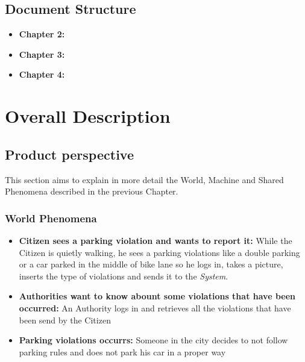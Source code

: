 \documentclass{article}
\begin{document}
\subsection{Document Structure}
\begin{itemize}
    \item \textbf{Chapter 2:}
    \item \textbf{Chapter 3:}
    \item \textbf{Chapter 4:}  
\end{itemize}

\section{Overall Description}

\subsection{Product perspective}
This section aims to explain in more detail the World, Machine and Shared Phenomena described in the 
previous Chapter. 
\subsubsection{World Phenomena}
\begin{itemize}
    \item \textbf{Citizen sees a parking violation and wants to report it:}
    While the Citizen is quietly walking, he sees a parking violations like a double parking or a car
    parked in the middle of bike lane so he logs in, takes a picture, inserts the type of violations
    and sends it to the \textit{System}.  
    \item \textbf{Authorities want to know abount some violations that have been occurred:}
    An Authority logs in and retrieves all the violations that have been send by the Citizen 
    \item \textbf{Parking violations occurrs:}
    Someone in the city decides to not follow parking rules and does not park his car in a proper way   
\end{itemize}
\end{document}
